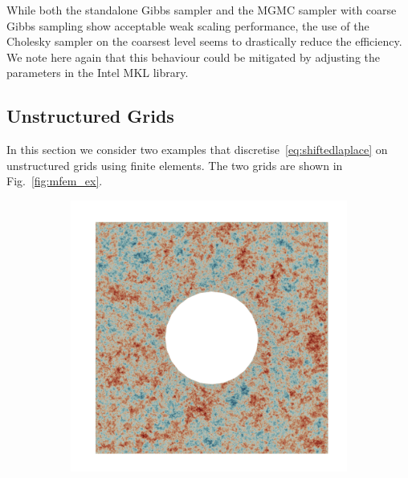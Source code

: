 \documentclass[
fontsize=11pt,
paper=a4,
numbers=noenddot
]{scrartcl}
\begin{document}
While both the standalone Gibbs sampler and the MGMC sampler with coarse Gibbs sampling show acceptable weak scaling performance, the use of the Cholesky sampler on the coarsest level seems to drastically reduce the efficiency. We note here again that this behaviour could be mitigated by adjusting the parameters in the Intel MKL library.

\subsection{Unstructured Grids}
In this section we consider two examples that discretise~\eqref{eq:shiftedlaplace} on unstructured grids using finite elements. The two grids are shown in Fig.~\ref{fig:mfem_ex}.

\begin{figure}[htbp]
    \centering
    \begin{subfigure}[b]{0.4\textwidth}
        \centering
        \includegraphics[width=\textwidth]{plots/paraview/square-disc_0_05.png}
    \end{subfigure}
    \hfill
    \begin{subfigure}[b]{0.4\textwidth}
        \centering

\end{subfigure}
\end{figure}
\end{document}
